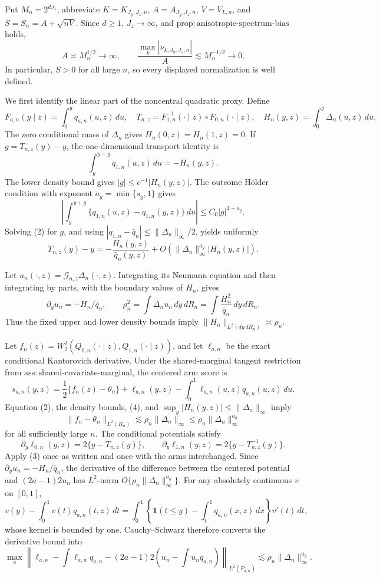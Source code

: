 Put \(M_n=2^{dJ_z}\), abbreviate \(K=K_{J_y,J_z,n}\), \(A=A_{J_y,J_z,n}\), \(V=V_{L,n}\), and \(S=S_n=A+\sqrt{nV}\). Since \(d\ge1\), \(J_z\to\infty\), and \(\mathrm{prop{:}anisotropic\text{-}spectrum\text{-}bias}\) holds,
\[
A\asymp M_n^{1/2}\longrightarrow\infty,
\qquad
\frac{\max_k|\nu_{k,J_y,J_z,n}|}{A}
\lesssim M_n^{-1/2}\longrightarrow0. \tag{1}
\]
In particular, \(S>0\) for all large \(n\), so every displayed normalization is well defined.

We first identify the linear part of the noncentral quadratic proxy. Define
\[
F_{a,n}(y\mid z)=\int_0^yq_{a,n}(u,z)\,du,
\quad
T_{n,z}=F_{1,n}^{-1}(\cdot\mid z)\circ F_{0,n}(\cdot\mid z),
\quad
H_n(y,z)=\int_0^y\Delta_n(u,z)\,du.
\]
The zero conditional mass of \(\Delta_n\) gives \(H_n(0,z)=H_n(1,z)=0\). If \(g=T_{n,z}(y)-y\), the one-dimensional transport identity is
\[
\int_y^{y+g}q_{1,n}(u,z)\,du=-H_n(y,z). \tag{2}
\]
The lower density bound gives \(|g|\le c^{-1}|H_n(y,z)|\). The outcome H\"older condition with exponent \(a_y=\min\{s_y,1\}\) gives
\[
\left|\int_y^{y+g}\{q_{1,n}(u,z)-q_{1,n}(y,z)\}\,du\right|
\le C_0|g|^{1+a_y}.
\]
Solving (2) for \(g\), and using \(|q_{1,n}-\bar q_n|\le\|\Delta_n\|_\infty/2\), yields uniformly
\[
T_{n,z}(y)-y
=-\frac{H_n(y,z)}{\bar q_n(y,z)}
+O\!\left(\|\Delta_n\|_\infty^{a_y}|H_n(y,z)|\right). \tag{3}
\]

Let \(u_n(\cdot,z)=\mathcal G_{n,z}\Delta_n(\cdot,z)\). Integrating its Neumann equation and then integrating by parts, with the boundary values of \(H_n\), gives
\[
\partial_yu_n=-H_n/\bar q_n,
\qquad
\rho_n^2=\int\Delta_nu_n\,dy\,dR_n
=\int\frac{H_n^2}{\bar q_n}\,dy\,dR_n. \tag{4}
\]
Thus the fixed upper and lower density bounds imply \(\|H_n\|_{L^2(dy\,dR_n)}\asymp\rho_n\).

Let \(f_n(z)=W_2^2(Q_{0,n}(\cdot\mid z),Q_{1,n}(\cdot\mid z))\), and let \(\ell_{a,n}\) be the exact conditional Kantorovich derivative. Under the shared-marginal tangent restriction from \(\mathrm{ass{:}shared\text{-}covariate\text{-}marginal}\), the centered arm score is
\[
s_{a,n}(y,z)
=\frac12\{f_n(z)-\theta_n\}
+\ell_{a,n}(y,z)-\int_0^1\ell_{a,n}(u,z)q_{a,n}(u,z)\,du. \tag{5}
\]
Equation (2), the density bounds, (4), and \(\sup_y|H_n(y,z)|\le\|\Delta_n\|_\infty\) imply
\[
\|f_n-\theta_n\|_{L^2(R_n)}
\lesssim\rho_n\|\Delta_n\|_\infty
\le\rho_n\|\Delta_n\|_\infty^{a_y} \tag{6}
\]
for all sufficiently large \(n\). The conditional potentials satisfy
\[
\partial_y\ell_{0,n}(y,z)=2\{y-T_{n,z}(y)\},
\qquad
\partial_y\ell_{1,n}(y,z)=2\{y-T_{n,z}^{-1}(y)\}.
\]
Apply (3) once as written and once with the arms interchanged. Since \(\partial_yu_n=-H_n/\bar q_n\), the derivative of the difference between the centered potential and \((2a-1)2u_n\) has \(L^2\)-norm \(O\{\rho_n\|\Delta_n\|_\infty^{a_y}\}\). For any absolutely continuous \(v\) on \([0,1]\),
\[
v(y)-\int_0^1v(t)q_{a,n}(t,z)\,dt
=\int_0^1\left\{\mathbf 1(t\le y)-\int_t^1q_{a,n}(x,z)\,dx\right\}v'(t)\,dt,
\]
whose kernel is bounded by one. Cauchy--Schwarz therefore converts the derivative bound into
\[
\max_a\left\|
\ell_{a,n}-\int\ell_{a,n}q_{a,n}
-(2a-1)2\left(u_n-\int u_nq_{a,n}\right)
\right\|_{L^2(P_{a,n})}
\lesssim\rho_n\|\Delta_n\|_\infty^{a_y}. \tag{7}
\]

